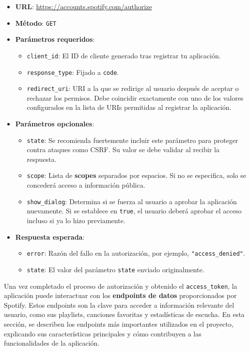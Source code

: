 \begin{itemize}
    \item \textbf{URL}: \url{https://accounts.spotify.com/authorize}
    \item \textbf{Método}: \texttt{GET}
    \item \textbf{Parámetros requeridos}:
          \begin{itemize}
              \item \texttt{client\_id}: El ID de cliente generado tras registrar tu aplicación.
              \item \texttt{response\_type}: Fijado a \texttt{code}.
              \item \texttt{redirect\_uri}: URI a la que se redirige al usuario después de aceptar o rechazar los permisos. Debe coincidir exactamente con uno de los valores configurados en la lista de URIs permitidas al registrar la aplicación.
          \end{itemize}
    \item \textbf{Parámetros opcionales}:
          \begin{itemize}
              \item \texttt{state}: Se recomienda fuertemente incluir este parámetro para proteger contra ataques como CSRF. Su valor se debe validar al recibir la respuesta.
              \item \texttt{scope}: Lista de \textbf{scopes} separados por espacios. Si no se especifica, solo se concederá acceso a información pública.
              \item \texttt{show\_dialog}: Determina si se fuerza al usuario a aprobar la aplicación nuevamente. Si se establece en \texttt{true}, el usuario deberá aprobar el acceso incluso si ya lo hizo previamente.
          \end{itemize}
    \item \textbf{Respuesta esperada}:
          \begin{itemize}
              \item \texttt{error}: Razón del fallo en la autorización, por ejemplo, \texttt{"access\_denied"}.
              \item \texttt{state}: El valor del parámetro \texttt{state} enviado originalmente.
          \end{itemize}
\end{itemize}

Una vez completado el proceso de autorización y obtenido el \texttt{access\_token}, la aplicación puede interactuar con los \textbf{endpoints de datos} proporcionados por Spotify. Estos endpoints son la clave para acceder a información relevante del usuario, como sus playlists, canciones favoritas y estadísticas de escucha. En esta sección, se describen los endpoints más importantes utilizados en el proyecto, explicando sus características principales y cómo contribuyen a las funcionalidades de la aplicación.


